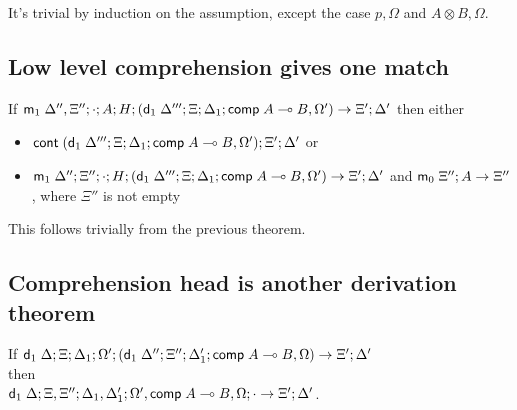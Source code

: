 It's trivial by induction on the assumption, except the case $p, \Omega$ and $A \otimes B, \Omega$.

\subsection{Low level comprehension gives one match}

If $\mathsf{m}_1 \; \Delta'', \Xi''; \cdot; A ; H; (\mathsf{d}_1 \; \Delta'''; \Xi; \Delta_1; \mathsf{comp} \; A \multimap B, \Omega') \rightarrow \Xi'; \Delta'$ then either

\begin{itemize}
\item $\mathsf{cont} \; (\mathsf{d}_1 \; \Delta'''; \Xi; \Delta_1; \mathsf{comp} \; A \multimap B, \Omega'); \Xi'; \Delta'$ or
\item $\mathsf{m}_1 \; \Delta'' ; \Xi''; \cdot; H; (\mathsf{d}_1 \; \Delta'''; \Xi; \Delta_1; \mathsf{comp} \; A \multimap B, \Omega') \rightarrow \Xi'; \Delta'$ and $\mathsf{m}_0 \; \Xi''; A \rightarrow \Xi''$, where $\Xi''$ is not empty
\end{itemize}

This follows trivially from the previous theorem.

\subsection{Comprehension head is another derivation theorem}

If $\mathsf{d}_1 \; \Delta; \Xi; \Delta_1; \Omega'; (\mathsf{d}_1 \; \Delta''; \Xi''; \Delta'_1; \mathsf{comp} \; A \multimap B, \Omega) \rightarrow \Xi'; \Delta'$ \\ then \\ $\mathsf{d}_1 \; \Delta; \Xi, \Xi''; \Delta_1, \Delta'_1; \Omega', \mathsf{comp} \; A \multimap B, \Omega; \cdot \rightarrow \Xi'; \Delta'$.

